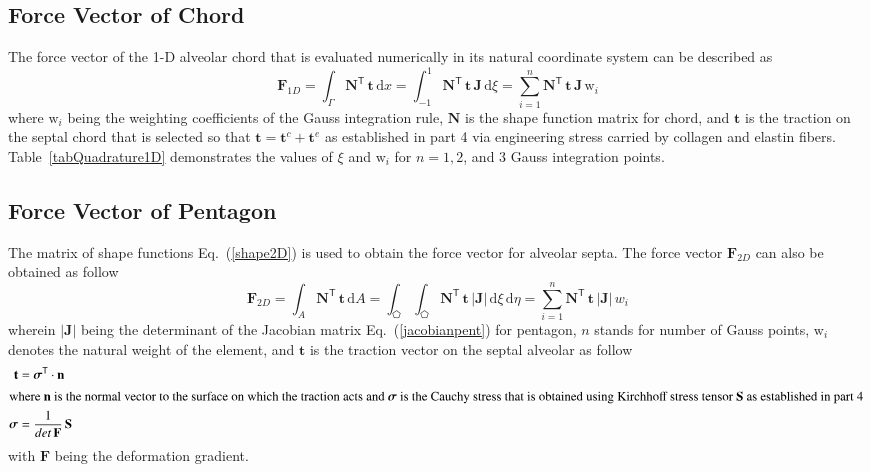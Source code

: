 \subsection{Force Vector of Chord}

The force vector of the 1-D alveolar chord that is evaluated numerically in its natural coordinate system can be described as
\begin{equation}
\mathbf{F}_{1D} = \int_{\Gamma} \mathbf{N}^{\mathsf{T}} \, \mathbf{t} \, \mathrm{d} x  = \int_{-1}^{1} \mathbf{N}^{\mathsf{T}}\, \mathbf{t} \, \mathbf{J}\,  \mathrm{d} \xi =  \sum_{i=1}^{n} \mathbf{N}^{\mathsf{T}} \, \mathbf{t} \, \mathbf{J} \, \mathrm{w}_i
\end{equation}
where $\mathrm{w}_i$ being the  weighting coefficients of the Gauss integration rule, $\mathbf{N}$ is the shape function matrix for chord, and $\mathbf{t}$ is the traction on the septal chord that is selected so that $\mathbf{t} = \mathbf{t}^c + \mathbf{t}^e $ as established in part 4 via engineering stress carried by collagen and elastin fibers.
Table~\ref{tabQuadrature1D} demonstrates the values of $\xi$ and $\mathrm{w}_i$ for $n = 1, 2$, and $3$ Gauss integration points.

\subsection{Force Vector of Pentagon}
The matrix of shape functions Eq.~(\ref{shape2D}) is used to obtain the force vector for alveolar septa.
The force vector $\mathbf{F}_{2D}$ can also be obtained as follow
\begin{equation}
\mathbf{F}_{2D} = \int_{A} \mathbf{N}^{\mathsf{T}} \, \mathbf{t} \, \mathrm{d} A = \int_{\pentagon} \int_{\pentagon} \mathbf{N}^{\mathsf{T}} \, \mathbf{t} \,|\mathbf{J}| \, \mathrm{d} \xi \, \mathrm{d} \eta = \sum_{i=1}^{n} \mathbf{N}^{\mathsf{T}} \, \mathbf{t} \,|\mathbf{J}| \, w_i
\end{equation}
wherein $|\mathbf{J}|$ being the determinant of the Jacobian matrix Eq.~(\ref{jacobianpent}) for pentagon, $n$ stands for number of Gauss points, $\mathrm{w}_i$ denotes the natural weight of the element, and $\mathbf{t}$ is the traction vector on the septal alveolar as follow
\begin{subequations}
	\begin{align}
	\mathbf{t} &= \boldsymbol{\sigma}^{\mathsf{T}} \cdot \mathbf{n} \\
	\intertext{where $ \mathbf{n} $ is the normal vector to the surface on which the traction acts and $ \boldsymbol{\sigma} $ is the Cauchy stress that is obtained using Kirchhoff stress tensor $ \mathbf{S} $ as established in part 4 }
	\boldsymbol{\sigma} &= \frac{1}{det\,\mathbf{F}} \, \mathbf{S}
	\end{align}
\end{subequations}
with $ \mathbf{F} $ being the deformation gradient.




